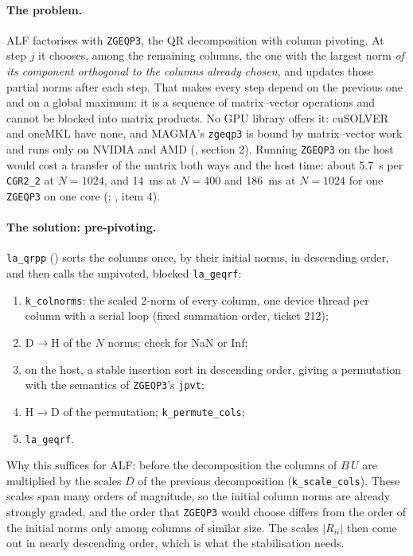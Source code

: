 \paragraph{The problem.} ALF factorises with \texttt{ZGEQP3}, the QR decomposition with column pivoting. At step $j$ it chooses, among the remaining columns, the one with the largest norm \emph{of its component orthogonal to the columns already chosen}, and updates those partial norms after each step. That makes every step depend on the previous one and on a global maximum: it is a sequence of matrix--vector operations and cannot be blocked into matrix products. No GPU library offers it: cuSOLVER and oneMKL have none, and MAGMA's \texttt{zgeqp3} is bound by matrix--vector work and runs only on NVIDIA and AMD (, section 2). Running \texttt{ZGEQP3} on the host would cost a transfer of the matrix both ways and the host time: about 5.7~s per \texttt{CGR2\_2} at $N=1024$, and 14~ms at $N=400$ and 186~ms at $N=1024$ for one \texttt{ZGEQP3} on one core (; , item 4). %

\paragraph{The solution: pre-pivoting.} \texttt{la\_qrpp} () sorts the columns once, by their initial norms, in descending order, and then calls the unpivoted, blocked \texttt{la\_geqrf}:
\begin{enumerate}
\item \texttt{k\_colnorms}: the scaled 2-norm of every column, one device thread per column with a serial loop (fixed summation order, ticket 212);
\item D$\to$H of the $N$ norms; check for NaN or Inf;
\item on the host, a stable insertion sort in descending order, giving a permutation with the semantics of \texttt{ZGEQP3}'s \texttt{jpvt};
\item H$\to$D of the permutation; \texttt{k\_permute\_cols};
\item \texttt{la\_geqrf}.
\end{enumerate}
Why this suffices for ALF: before the decomposition the columns of $B\,U$ are multiplied by the scales $D$ of the previous decomposition (\texttt{k\_scale\_cols}). These scales span many orders of magnitude, so the initial column norms are already strongly graded, and the order that \texttt{ZGEQP3} would choose differs from the order of the initial norms only among columns of similar size. The scales $|R_{ii}|$ then come out in nearly descending order, which is what the stabilisation needs.

